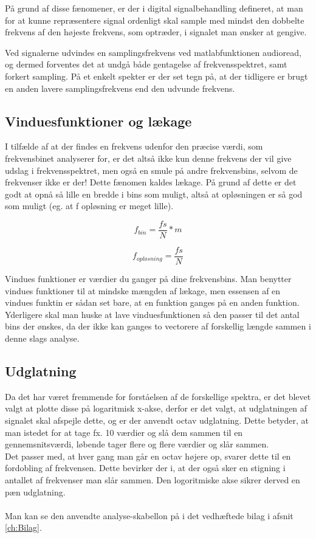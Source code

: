  På grund af disse fænomener, er der i digital signalbehandling defineret, at man for at kunne repræsentere signal ordenligt skal sample med mindst den dobbelte frekvens af den højeste frekvens, som optræder, i signalet man ønsker at gengive. 
 
  Ved signalerne udvindes en samplingsfrekvens ved matlabfunktionen audioread, og dermed forventes det at undgå både gentagelse af frekvensspektret, samt forkert sampling. På et enkelt spekter er der set tegn på, at der tidligere er brugt en anden lavere samplingsfrekvens end den udvunde frekvens.

\subsection{Vinduesfunktioner og lækage}
 I tilfælde af at der findes en frekvens udenfor den præcise værdi, som frekvensbinet analyserer for, er det altså ikke kun denne frekvens der vil give udslag i frekvensspektret, men også en smule på andre frekvensbins, selvom de frekvenser ikke er der! Dette fænomen kaldes lækage. På grund af dette er det godt at opnå så lille en bredde i bins som muligt, altså at opløsningen er så god som muligt (eg. at f opløsning er meget lille).  

 \begin{equation}\label{eq:bins}
 f_{bin} = \frac{fs}{N}*m 
 \end{equation}

\begin{equation}\label{eq:bins}
f_{opløsning} = \frac{fs}{N} 
\end{equation}

Vindues funktioner er værdier du ganger på dine frekvensbins. Man benytter vindues funktioner til at mindske mængden af lækage, men essensen af en vindues funktin er sådan set bare, at en funktion ganges på en anden funktion. Yderligere skal man huske at lave vinduesfunktionen så den passer til det antal bins der ønskes, da der ikke kan ganges to vectorere af forskellig længde sammen i denne slags analyse.

\subsection{Udglatning}

Da det har været fremmende for forståelsen af de forskellige spektra, er det blevet valgt at plotte disse på logaritmisk x-akse, derfor er det valgt, at udglatningen af signalet skal afspejle dette, og er der anvendt octav udglatning. Dette betyder, at man istedet for at tage fx. 10 værdier og slå dem sammen til en gennemsnitsværdi, løbende tager flere og flere værdier og slår sammen. \\Det passer med, at hver gang man går en octav højere op, svarer dette til en fordobling af frekvensen. Dette bevirker der i, at der også sker en stigning i antallet af frekvenser man slår sammen. Den logoritmiske akse sikrer derved en pæn udglatning.
\\\\
Man kan se den anvendte analyse-skabellon på i det vedhæftede bilag i afsnit \ref{ch:Bilag}.



